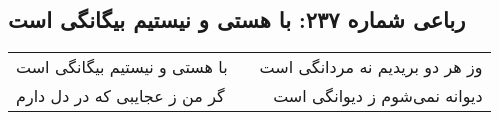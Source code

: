 \begin{center}
\section*{رباعی شماره ۲۳۷: با هستی و نیستیم بیگانگی است}
\label{sec:0237}
\begin{longtable}{l p{0.5cm} r}
با هستی و نیستیم بیگانگی است
&&
وز هر دو بریدیم نه مردانگی است
\\
گر من ز عجایبی که در دل دارم
&&
دیوانه نمی‌شوم ز دیوانگی است
\\
\end{longtable}
\end{center}
